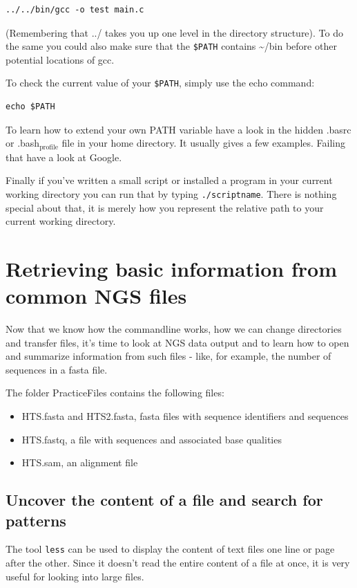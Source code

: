 \documentclass[11pt]{article}
\begin{document}
\begin{verbatim}
../../bin/gcc -o test main.c
\end{verbatim}

(Remembering that ../ takes you up one level in the directory
structure). To do the same you could also make sure that the \texttt{\$PATH}
contains \textasciitilde{}/bin before other potential locations of gcc.

To check the current value of your \texttt{\$PATH}, simply use the echo command:

\begin{verbatim}
echo $PATH
\end{verbatim}


To learn how to extend your own PATH variable have a look in the hidden
.basrc or .bash\(_{\text{profile}}\) file in your home directory. It usually gives a
few examples. Failing that have a look at Google.

Finally if you've written a small script or installed a program in your
current working directory you can run that by typing \texttt{./scriptname}. There
is nothing special about that, it is merely how you represent the
relative path to your current working directory.

\section{Retrieving basic information from common NGS files}
\label{sec-4}

Now that we know how the commandline works, how we can change
directories and transfer files, it's time to look at NGS data output
and to learn how to open and summarize information from such files -
like, for example, the number of sequences in a fasta file.

The folder PracticeFiles contains the following files:
\begin{itemize}
\item HTS.fasta and HTS2.fasta, fasta files with sequence identifiers and sequences
\item HTS.fastq, a file with sequences and associated base qualities
\item HTS.sam, an alignment file
\end{itemize}

\subsection{Uncover the content of a file and search for patterns}
\label{sec-4-1}
The tool \texttt{less} can be used to display the content of text files one
line or page after the other. Since it doesn't read the entire content
of a file at once, it is very useful for looking into large files.
\end{document}
